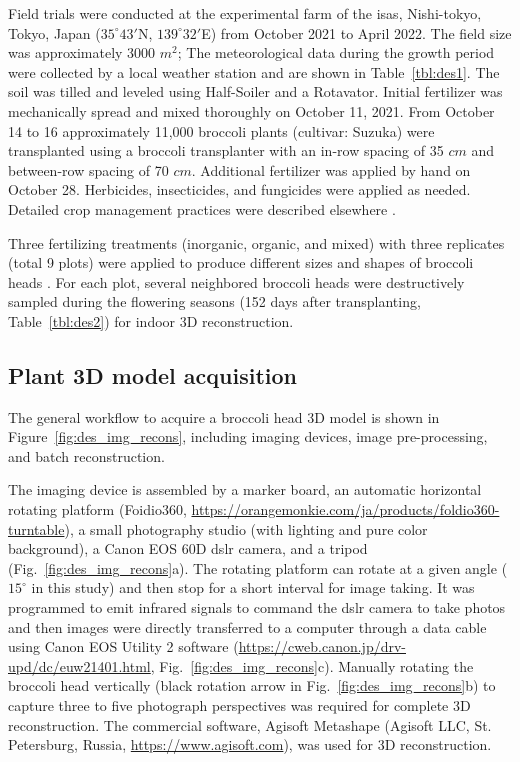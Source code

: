 Field trials were conducted at the experimental farm of the \gls{isas}, Nishi-tokyo, Tokyo, Japan ($35^\circ 43'$N, $139^\circ 32'$E) from October 2021 to April 2022. The field size was approximately 3000 $m^2$; The meteorological data during the growth period were collected by a local weather station and are shown in Table~\ref{tbl:des1}. The soil was tilled and leveled using Half-Soiler and a Rotavator. Initial fertilizer was mechanically spread and mixed thoroughly on October 11, 2021. From October 14 to 16 approximately 11,000 broccoli plants (cultivar: Suzuka) were transplanted using a broccoli transplanter with an in-row spacing of 35 $cm$ and between-row spacing of 70 $cm$. Additional fertilizer was applied by hand on October 28. Herbicides, insecticides, and fungicides were applied as needed. Detailed crop management practices were described elsewhere \citep{nishida_estimation_2023}.



Three fertilizing treatments (inorganic, organic, and mixed) with three replicates (total 9 plots) were applied to produce different sizes and shapes of broccoli heads \citep{nishida_estimation_2023}. For each plot, several neighbored broccoli heads were destructively sampled during the flowering seasons (152 days after transplanting, Table~\ref{tbl:des2}) for indoor 3D reconstruction. 



\subsection{Plant 3D model acquisition}\label{sec:3ddb}

The general workflow to acquire a broccoli head 3D model is shown in Figure~\ref{fig:des_img_recons}, including imaging devices, image pre-processing, and batch reconstruction.



The imaging device is assembled by a marker board, an automatic horizontal rotating platform (Foidio360, \url{https://orangemonkie.com/ja/products/foldio360-turntable}), a small photography studio (with lighting and pure color background), a Canon EOS 60D \gls{dslr} camera, and a tripod (Fig.~\ref{fig:des_img_recons}a). The rotating platform can rotate at a given angle ($15^\circ$ in this study) and then stop for a short interval for image taking. It was programmed to emit infrared signals to command the \gls{dslr} camera to take photos and then images were directly transferred to a computer through a data cable using Canon EOS Utility 2 software (\url{https://cweb.canon.jp/drv-upd/dc/euw21401.html}, Fig.~\ref{fig:des_img_recons}c). Manually rotating the broccoli head vertically (black rotation arrow in Fig.~\ref{fig:des_img_recons}b) to capture three to five photograph perspectives was required for complete 3D reconstruction. The commercial software, Agisoft Metashape (Agisoft LLC, St. Petersburg, Russia, \url{https://www.agisoft.com}), was used for 3D reconstruction.

